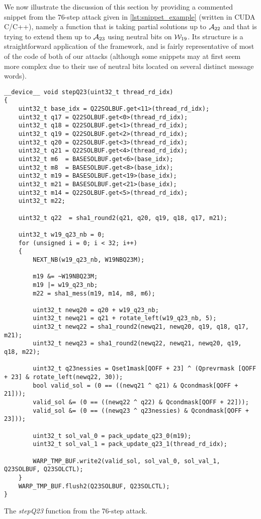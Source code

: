 We now illustrate the discussion of this section by providing a commented snippet from the 76-step attack given in \autoref{lst:snippet_example} (written in \textsf{CUDA C/C++}), namely a function that is taking partial solutions up to $\mathcal{A}_{22}$  and that is
trying to extend them up to $\mathcal{A}_{23}$ using neutral bits on $\mathcal{W}_{19}$. Its structure is a straightforward application of the framework, and is fairly representative of most of the
code of both of our attacks (although some snippets may at first seem more complex due to their use of neutral bits located on several distinct message words).

\begin{listing}[tbh]
\begin{center}
\begin{verbatim}
__device__ void stepQ23(uint32_t thread_rd_idx)
{
	uint32_t base_idx = Q22SOLBUF.get<11>(thread_rd_idx);
	uint32_t q17 = Q22SOLBUF.get<0>(thread_rd_idx);
	uint32_t q18 = Q22SOLBUF.get<1>(thread_rd_idx);
	uint32_t q19 = Q22SOLBUF.get<2>(thread_rd_idx);
	uint32_t q20 = Q22SOLBUF.get<3>(thread_rd_idx);
	uint32_t q21 = Q22SOLBUF.get<4>(thread_rd_idx);
	uint32_t m6  = BASESOLBUF.get<6>(base_idx);
	uint32_t m8  = BASESOLBUF.get<8>(base_idx);
	uint32_t m19 = BASESOLBUF.get<19>(base_idx);
	uint32_t m21 = BASESOLBUF.get<21>(base_idx);
	uint32_t m14 = Q22SOLBUF.get<5>(thread_rd_idx);
	uint32_t m22;

	uint32_t q22  = sha1_round2(q21, q20, q19, q18, q17, m21);

	uint32_t w19_q23_nb = 0;
	for (unsigned i = 0; i < 32; i++)
	{
		NEXT_NB(w19_q23_nb, W19NBQ23M);

		m19 &= ~W19NBQ23M;
		m19 |= w19_q23_nb;
		m22 = sha1_mess(m19, m14, m8, m6);

		uint32_t newq20 = q20 + w19_q23_nb;
		uint32_t newq21 = q21 + rotate_left(w19_q23_nb, 5);
		uint32_t newq22 = sha1_round2(newq21, newq20, q19, q18, q17, m21);
		uint32_t newq23 = sha1_round2(newq22, newq21, newq20, q19, q18, m22);

		uint32_t q23nessies = Qset1mask[QOFF + 23] ^ (Qprevrmask [QOFF + 23] & rotate_left(newq22, 30));
		bool valid_sol = (0 == ((newq21 ^ q21) & Qcondmask[QOFF + 21]));
		valid_sol &= (0 == ((newq22 ^ q22) & Qcondmask[QOFF + 22]));
		valid_sol &= (0 == ((newq23 ^ q23nessies) & Qcondmask[QOFF + 23]));

		uint32_t sol_val_0 = pack_update_q23_0(m19);
		uint32_t sol_val_1 = pack_update_q23_1(thread_rd_idx);

		WARP_TMP_BUF.write2(valid_sol, sol_val_0, sol_val_1, Q23SOLBUF, Q23SOLCTL);
	}
	WARP_TMP_BUF.flush2(Q23SOLBUF, Q23SOLCTL);
}
\end{verbatim}
\end{center}
\caption{The \emph{stepQ23} function from the 76-step attack.}
\label{lst:snippet_example}
\end{listing}

